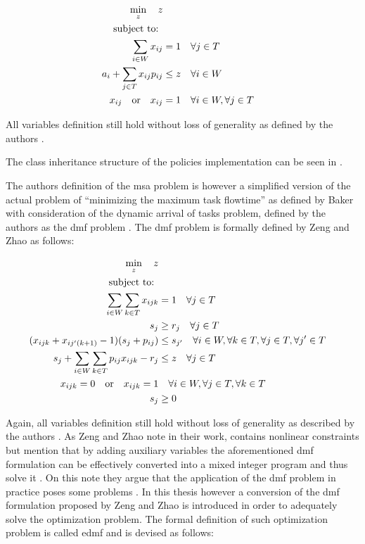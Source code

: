 \documentclass{seal_thesis}
\begin{document}
\begin{align}
    \min_z \quad z\\
    \text{subject to: } \notag \\
    \sum_{i \in W} x_{ij} &= 1 \quad \forall j \in T\\
    a_i + \sum_{j \in T} x_{ij} p_{ij} &\leq z \quad \forall i \in W\\
    x_{ij} \quad \text{or} \quad x_{ij}&=1 \quad \forall i \in W, \forall j \in T
\end{align}

All variables definition still hold without loss of generality as defined by the authors \cite[pp. 5-7]{Zeng2005}.

The class inheritance structure of the policies implementation can be seen in .


The authors definition of the \gls{msa} problem is however a simplified version of the actual problem of ``minimizing the maximum task flowtime'' as defined by Baker \cite{Baker1974} with consideration of the dynamic arrival of tasks problem, defined by the authors as the \gls{dmf} problem \cite{Zeng2005}. The \gls{dmf} problem is formally defined by Zeng and Zhao as follows:

\begin{align}
    \min_z \quad z\\
    \text{subject to: } \notag \\
    \sum_{i \in W} \sum_{k \in T} x_{ijk} &= 1 \quad \forall j \in T\\
    s_j &\geq r_j \quad \forall j \in T\\
    (x_{ijk} + x_{ij'(k+1)} - 1)(s_j + p_{ij}) &\leq s_{j'} \quad \forall i \in W, \forall k \in T, \forall j \in T, \forall j' \in T \label{eq:nonlinear_constraints_dmf}\\
    s_j + \sum_{i \in W} \sum_{k \in T} p_{ij} x_{ijk} - r_j &\leq z \quad \forall j \in T\\
    x_{ijk} = 0 \quad \text{or} \quad x_{ijk} = 1 &\quad \forall i \in W, \forall j \in T, \forall k \in T\\
    s_j &\geq 0
\end{align}

Again, all variables definition still hold without loss of generality as described by the authors \cite[p. 6]{Zeng2005}. As Zeng and Zhao note in their work,  contains nonlinear constraints but mention that by adding auxiliary variables the aforementioned \gls{dmf} formulation can be effectively converted into a mixed integer program and thus solve it \cite[p. 6]{Zeng2005}. On this note they argue that the application of the \gls{dmf} problem in practice poses some problems \cite{Zeng2005}. In this thesis however a conversion of the \gls{dmf} formulation proposed by Zeng and Zhao is introduced in order to adequately solve the optimization problem. The formal definition of such optimization problem is called \gls{edmf} and is devised as follows:
\end{document}
